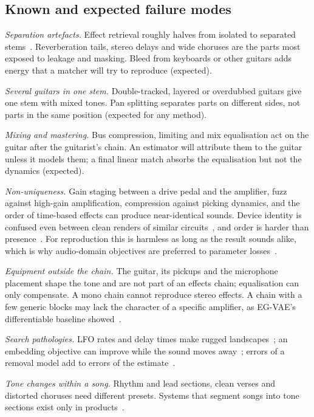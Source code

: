 \subsection{Known and expected failure modes}

\emph{Separation artefacts.} Effect retrieval roughly halves from isolated to
separated stems~\cite{yeh2025fxencoder}. Reverberation tails, stereo delays and
wide choruses are the parts most exposed to leakage and masking. Bleed from
keyboards or other guitars adds energy that a matcher will try to reproduce
(expected).

\emph{Several guitars in one stem.} Double-tracked, layered or overdubbed
guitars give one stem with mixed tones. Pan splitting separates parts on
different sides, not parts in the same position (expected for any method).

\emph{Mixing and mastering.} Bus compression, limiting and mix equalisation
act on the guitar after the guitarist's chain. An estimator will attribute
them to the guitar unless it models them; a final linear match absorbs the
equalisation but not the dynamics (expected).

\emph{Non-uniqueness.} Gain staging between a drive pedal and the amplifier,
fuzz against high-gain amplification, compression against picking dynamics,
and the order of time-based effects can produce near-identical sounds. Device
identity is confused even between clean renders of similar
circuits~\cite{comunita2021guitar}, and order is harder than presence~\cite{wada2025hyperbolic}.
For reproduction this is harmless as long as the result sounds alike, which is
why audio-domain objectives are preferred to parameter
losses~\cite{peladeau2024blind}.

\emph{Equipment outside the chain.} The guitar, its pickups and the
microphone placement shape the tone and are not part of an effects chain;
equalisation can only compensate. A mono chain cannot reproduce stereo
effects. A chain with a few generic blocks may lack the character of a
specific amplifier, as EG-VAE's differentiable baseline
showed~\cite{yeh2026egvae}.

\emph{Search pathologies.} LFO rates and delay times make rugged
landscapes~\cite{okita2026audio,uzrad2024diffmoog}; an embedding objective can
improve while the sound moves away~\cite{long2026tape}; errors of a removal
model add to errors of the estimate~\cite{take2024audio}.

\emph{Tone changes within a song.} Rhythm and lead sections, clean verses and
distorted choruses need different presets. Systems that segment songs into
tone sections exist only in products~\cite{bouharb2026gptonebuilder}.

